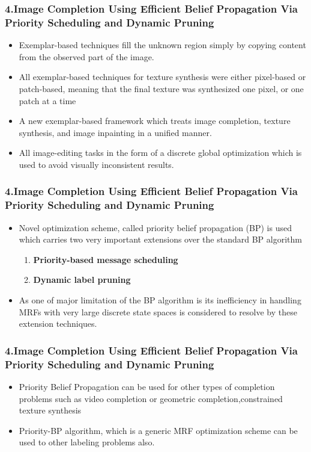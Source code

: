 \documentclass{beamer}
\begin{document}
\begin{frame}
\frametitle{\textbf{4.Image Completion Using Efficient Belief Propagation
Via Priority Scheduling and Dynamic Pruning}}
\begin{itemize}
\item Exemplar-based techniques  fill the unknown region simply by copying content from the observed part of the image.
\item All exemplar-based techniques for texture synthesis  were either pixel-based or patch-based, meaning that the final texture was synthesized one pixel, or one patch at a time
\item A new exemplar-based framework  which treats image completion, texture synthesis, and image inpainting in a unified manner.
\item All   image-editing tasks in the form of a discrete global optimization which is used to avoid visually inconsistent results.
\end{itemize}
\end{frame}

\begin{frame}
\frametitle{\textbf{4.Image Completion Using Efficient Belief Propagation
Via Priority Scheduling and Dynamic Pruning}}
\begin{itemize}
\item Novel optimization scheme, called priority belief propagation (BP) is used  which carries two very important extensions over the standard BP algorithm
\begin{enumerate}
  \item \textbf{Priority-based message scheduling}
  \item \textbf{Dynamic label pruning}
\end{enumerate}
\item As one of  major limitation of the BP algorithm  is  its inefficiency in handling MRFs with very large discrete state spaces is considered to resolve by these extension techniques.
\end{itemize}
\end{frame}


\begin{frame}
\frametitle{\textbf{4.Image Completion Using Efficient Belief Propagation
Via Priority Scheduling and Dynamic Pruning}}
\begin{itemize}
\item Priority Belief Propagation  can be used for other types of completion problems such as video completion or geometric completion,constrained texture synthesis
\item Priority-BP algorithm, which is a generic MRF optimization scheme can be used to other labeling problems also.
\end{itemize}
\end{frame}
\end{document}
